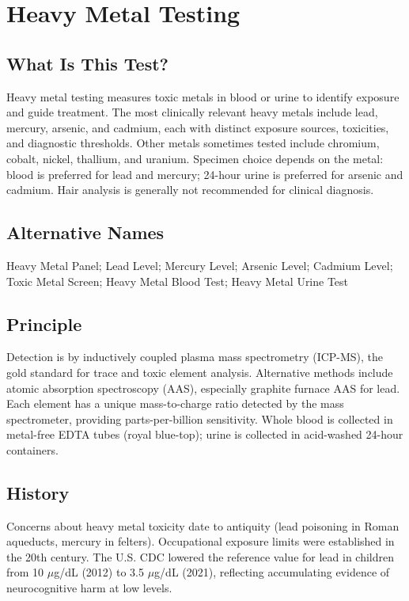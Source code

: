 \chapter{Heavy Metal Testing}

\section*{What Is This Test?}
Heavy metal testing measures toxic metals in blood or urine to identify exposure and guide treatment. The most clinically relevant heavy metals include lead, mercury, arsenic, and cadmium, each with distinct exposure sources, toxicities, and diagnostic thresholds. Other metals sometimes tested include chromium, cobalt, nickel, thallium, and uranium. Specimen choice depends on the metal: blood is preferred for lead and mercury; 24-hour urine is preferred for arsenic and cadmium. Hair analysis is generally not recommended for clinical diagnosis.

\section*{Alternative Names}
Heavy Metal Panel; Lead Level; Mercury Level; Arsenic Level; Cadmium Level; Toxic Metal Screen; Heavy Metal Blood Test; Heavy Metal Urine Test

\section*{Principle}
Detection is by inductively coupled plasma mass spectrometry (ICP-MS), the gold standard for trace and toxic element analysis. Alternative methods include atomic absorption spectroscopy (AAS), especially graphite furnace AAS for lead. Each element has a unique mass-to-charge ratio detected by the mass spectrometer, providing parts-per-billion sensitivity. Whole blood is collected in metal-free EDTA tubes (royal blue-top); urine is collected in acid-washed 24-hour containers.

\section*{History}
Concerns about heavy metal toxicity date to antiquity (lead poisoning in Roman aqueducts, mercury in felters). Occupational exposure limits were established in the 20th century. The U.S. CDC lowered the reference value for lead in children from 10 $\mu$g/dL (2012) to 3.5 $\mu$g/dL (2021), reflecting accumulating evidence of neurocognitive harm at low levels.

